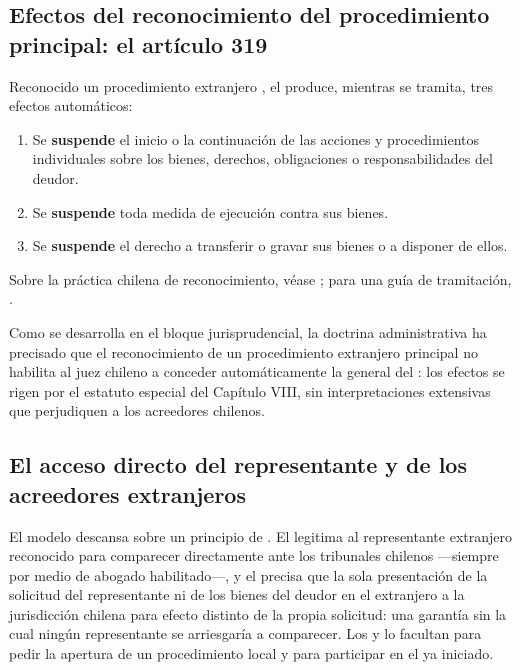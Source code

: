 \subsection{Efectos del reconocimiento del procedimiento principal: el artículo 319}

Reconocido un procedimiento extranjero , el  produce, mientras se
tramita, tres efectos automáticos:

\begin{enumerate}
  \item Se \textbf{suspende} el inicio o la continuación de las acciones y procedimientos
  individuales sobre los bienes, derechos, obligaciones o responsabilidades del deudor.
  \item Se \textbf{suspende} toda medida de ejecución contra sus bienes.
  \item Se \textbf{suspende} el derecho a transferir o gravar sus bienes o a disponer de
  ellos.
\end{enumerate}

Sobre la práctica chilena de reconocimiento, véase \textcite{doc-reconocimiento-extranjero};
para una guía de tramitación, \textcite{doc-transfronteriza-guia}.

\begin{alerta}
Como se desarrolla en el bloque jurisprudencial, la doctrina administrativa ha precisado que
el reconocimiento de un procedimiento extranjero principal no habilita al juez chileno a
conceder automáticamente la \pfc{} general del  : los efectos se rigen por el
estatuto especial del Capítulo VIII, sin interpretaciones extensivas que perjudiquen a los
acreedores chilenos.
\end{alerta}

\subsection{El acceso directo del representante y de los acreedores extranjeros}

El modelo descansa sobre un principio de . El  legitima al
representante extranjero reconocido para comparecer directamente ante los tribunales chilenos
---siempre por medio de abogado habilitado---, y el  precisa que la sola presentación de
la solicitud  del representante ni de los bienes del deudor en el
extranjero a la jurisdicción chilena para efecto distinto de la propia solicitud: una garantía
sin la cual ningún representante se arriesgaría a comparecer. Los  y  lo
facultan para pedir la apertura de un procedimiento local y para participar en el ya iniciado.

